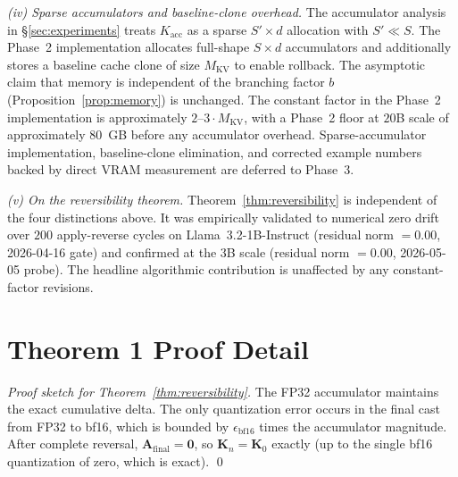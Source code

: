 \documentclass{article}
\begin{document}
\textit{(iv) Sparse accumulators and baseline-clone overhead.} The accumulator analysis in §\ref{sec:experiments} treats $K_{\text{acc}}$ as a sparse $S' \times d$ allocation with $S' \ll S$. The Phase~2 implementation allocates full-shape $S \times d$ accumulators and additionally stores a baseline cache clone of size $M_{\text{KV}}$ to enable rollback. The asymptotic claim that memory is independent of the branching factor $b$ (Proposition~\ref{prop:memory}) is unchanged. The constant factor in the Phase~2 implementation is approximately $2$--$3 \cdot M_{\text{KV}}$, with a Phase~2 floor at $20$B scale of approximately $80$~GB before any accumulator overhead. Sparse-accumulator implementation, baseline-clone elimination, and corrected example numbers backed by direct VRAM measurement are deferred to Phase~3.

\textit{(v) On the reversibility theorem.} Theorem~\ref{thm:reversibility} is independent of the four distinctions above. It was empirically validated to numerical zero drift over $200$ apply-reverse cycles on Llama~3.2-1B-Instruct (residual norm $= 0.00$, 2026-04-16 gate) and confirmed at the 3B scale (residual norm $= 0.00$, 2026-05-05 probe). The headline algorithmic contribution is unaffected by any constant-factor revisions.

\section{Theorem 1 Proof Detail}\label{sec:appendix-proof}

\begin{proof}[Proof sketch for Theorem~\ref{thm:reversibility}]
The FP32 accumulator maintains the exact cumulative delta. The only quantization error occurs in the final cast from FP32 to bf16, which is bounded by $\epsilon_{\text{bf16}}$ times the accumulator magnitude. After complete reversal, $\mathbf{A}_{\text{final}} = \mathbf{0}$, so $\mathbf{K}_n = \mathbf{K}_0$ exactly (up to the single bf16 quantization of zero, which is exact). \qed
\end{proof}

\end{document}
